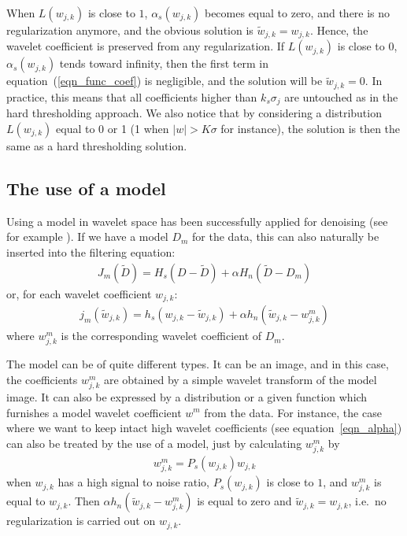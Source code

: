 When $L(w_{j,k})$ is close to $1$, $\alpha_s(w_{j,k})$ becomes equal to zero, and there
is no regularization anymore, and the obvious solution is $\tilde w_{j,k} = w_{j,k}$.
Hence, the wavelet coefficient is preserved from any regularization.
If $L(w_{j,k})$ is close to $0$, $\alpha_s(w_{j,k})$  tends toward infinity, then the
first term in equation~(\ref{eqn_func_coef}) is negligible, and the solution
will be $\tilde w_{j,k} = 0$. In practice, this means that all coefficients higher
than $k_s \sigma_j$ are untouched as in the hard thresholding approach.
We also notice that by considering a distribution $L(w_{j,k})$ equal to 
0 or 1 (1 when 
$\mid w \mid > K\sigma$ for instance), the solution is then the same as a
hard thresholding solution. 

\subsection{The use of a model}
 
Using a model in wavelet space has been successfully applied for 
denoising (see for example \cite{wave:chipman97,wave:crouse98,wave:jansen98}).
If we have a model $D_m$ for the data, this can also naturally be inserted 
into the filtering equation:
\begin{eqnarray}
J_m(\tilde D) = H_s(D-\tilde D) + \alpha H_n(\tilde D - D_m)
\end{eqnarray}
or, for each wavelet coefficient $w_{j,k}$:
\begin{eqnarray}
j_m(\tilde w_{j,k}) = h_s(w_{j,k}-\tilde w_{j,k}) + \alpha h_n(\tilde w_{j,k} - w_{j,k}^m)
\label{eqn_func_coef_jm}
\end{eqnarray}
where $w_{j,k}^m$ is the corresponding wavelet coefficient of $D_m$.

The model can be of quite different types. 
It can be an image, and in this case,
the coefficients $w_{j,k}^m$ are obtained by a simple wavelet transform of the 
model image.  It can also be expressed by a distribution or a 
given function which
furnishes a model wavelet coefficient $w^m$ from the data. For instance, the 
case where we want to keep intact high wavelet coefficients 
(see equation~\ref{eqn_alpha}) can also be treated by the use of a model, just
by calculating $w_{j,k}^m$ by
\begin{eqnarray}
w_{j,k}^m = P_s(w_{j,k}) w_{j,k}
\label{eqn_wm}
\end{eqnarray}
when $w_{j,k}$ has a high signal to noise ratio, $P_s(w_{j,k})$ is close to $1$, and 
$w_{j,k}^m$ is equal to $w_{j,k}$. Then $\alpha h_n(\tilde w_{j,k} - w_{j,k}^m)$ is equal to zero
and $\tilde w_{j,k} = w_{j,k}$, i.e.\ no regularization is 
carried out on $w_{j,k}$. 

